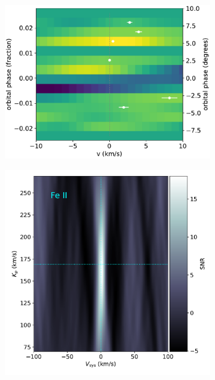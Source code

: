 \documentclass[twocolumn]{aastex631}
\begin{document}
\begin{figure}[ht!]
            \begin{subfigure}[b]{0.333\textwidth}\label{fig:wind-chars-Fe-combined}
                \includegraphics[width=\textwidth]{plots-updated/line-velocity/binned/pcolor/points/KELT-20b.Fe.phase-binned+RVs.pdf}
            \end{subfigure}

            \begin{subfigure}[b]{0.333\textwidth}\label{fig:2d-ccf-Fe+-combined}
                \includegraphics[width=\textwidth]{plots-updated/kp-vsys-map/combined/KELT-20b.20190504.combined.Fe+.CCFs-shifted.pdf}
            \end{subfigure}


\end{figure}
\end{document}
